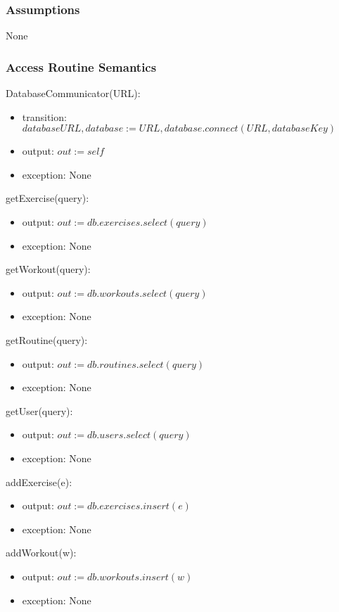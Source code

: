 \documentclass[12pt, titlepage]{article}
\begin{document}
\subsubsection{Assumptions}
None
\subsubsection{Access Routine Semantics}

DatabaseCommunicator(URL):
\begin{itemize}
	\item transition: $databaseURL, database := URL, database.connect(URL, databaseKey)$
	\item output: $out := self$
	\item exception: None
\end{itemize}

getExercise(query):
\begin{itemize}
	\item output: $out := db.exercises.select(query)$
	\item exception: None
\end{itemize}

getWorkout(query):
\begin{itemize}
	\item output: $out := db.workouts.select(query)$
	\item exception: None
\end{itemize}

getRoutine(query):
\begin{itemize}
	\item output: $out := db.routines.select(query)$
	\item exception: None
\end{itemize}

getUser(query):
\begin{itemize}
	\item output: $out := db.users.select(query)$
	\item exception: None
\end{itemize}


addExercise(e):
\begin{itemize}
	\item output: $out := db.exercises.insert(e)$
	\item exception: None
\end{itemize}

addWorkout(w):
\begin{itemize}
	\item output: $out := db.workouts.insert(w)$
	\item exception: None
\end{itemize}
\end{document}
